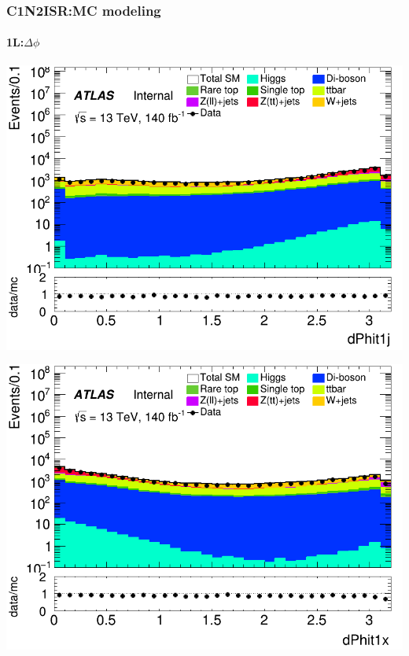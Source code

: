 \documentclass[usenames,dvipsnames]{beamer}
\begin{document}
\begin{frame}
\frametitle{C1N2ISR:MC modeling}
\framesubtitle{1L:\quad $\Delta\phi$}
    \begin{minipage}{0.32\textwidth}
        \centering
        \includegraphics[width=\textwidth]{graphics/L_met/L_met_dPhit1j.png}
    \end{minipage}
    \hfill
    \begin{minipage}{0.32\textwidth}
        \centering
        \includegraphics[width=\textwidth]{graphics/L_met/L_met_dPhit1x.png}
    \end{minipage}
    \hfill
    \begin{minipage}{0.32\textwidth}
        \centering

\end{minipage}
\end{frame}
\end{document}
